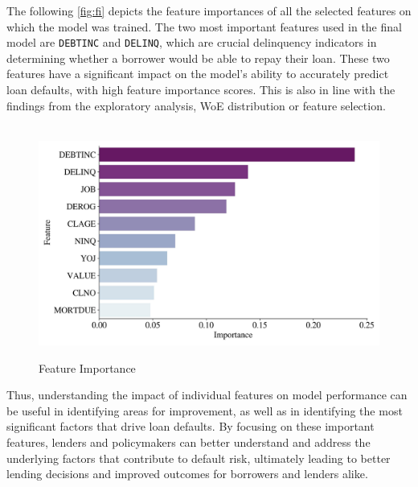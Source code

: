 The following \autoref{fig:fi} depicts the feature importances of all the selected features on which the model was trained.
The two most important features used in the final model are \texttt{DEBTINC} and \texttt{DELINQ}, which are crucial delinquency indicators in determining whether a borrower would be able to repay their loan. These two features have a significant impact on the model's ability to accurately predict loan defaults, with high feature importance scores. This is also in line with the findings from the exploratory analysis, WoE distribution or feature selection.
\begin{figure}[H]
\centering
\caption{Feature Importance}\vspace{0.5em}
\label{fig:fi}\
\includegraphics[width=140mm]{Figures/Feature_Importances.jpg}
\vspace{-1em}
\end{figure}

Thus, understanding the impact of individual features on model performance can be useful in identifying areas for improvement, as well as in identifying the most significant factors that drive loan defaults.
By focusing on these important features, lenders and policymakers can better understand and address the underlying factors that contribute to default risk, ultimately leading to better lending decisions and improved outcomes for borrowers and lenders alike.


